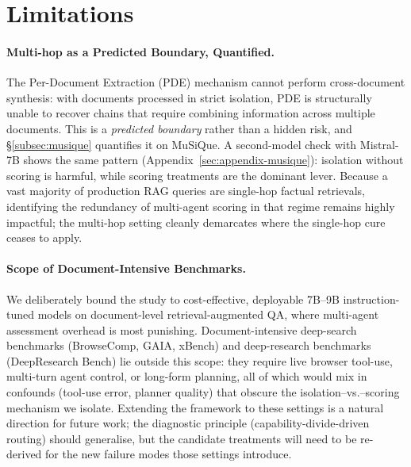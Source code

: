 \documentclass[11pt]{article}
\theoremstyle{definition}
\begin{document}
\section*{Limitations}
\label{sec:limitations}

\paragraph{Multi-hop as a Predicted Boundary, Quantified.}
The Per-Document Extraction (PDE) mechanism cannot perform cross-document synthesis: with documents processed in strict isolation, PDE is structurally unable to recover chains that require combining information across multiple documents. This is a \emph{predicted boundary} rather than a hidden risk, and \S\ref{subsec:musique} quantifies it on MuSiQue. A second-model check with Mistral-7B shows the same pattern (Appendix~\ref{sec:appendix-musique}): isolation without scoring is harmful, while scoring treatments are the dominant lever. Because a vast majority of production RAG queries are single-hop factual retrievals, identifying the redundancy of multi-agent scoring in that regime remains highly impactful; the multi-hop setting cleanly demarcates where the single-hop cure ceases to apply.


\paragraph{Scope of Document-Intensive Benchmarks.}
We deliberately bound the study to cost-effective, deployable 7B--9B instruction-tuned models on document-level retrieval-augmented QA, where multi-agent assessment overhead is most punishing. Document-intensive deep-search benchmarks (BrowseComp, GAIA, xBench) and deep-research benchmarks (DeepResearch Bench) lie outside this scope: they require live browser tool-use, multi-turn agent control, or long-form planning, all of which would mix in confounds (tool-use error, planner quality) that obscure the isolation--vs.--scoring mechanism we isolate. Extending the framework to these settings is a natural direction for future work; the diagnostic principle (capability-divide-driven routing) should generalise, but the candidate treatments will need to be re-derived for the new failure modes those settings introduce.
\end{document}
